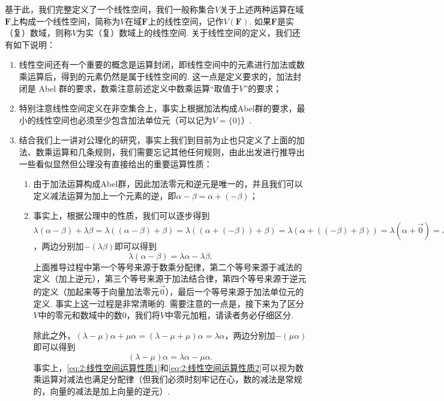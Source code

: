 基于此，我们完整定义了一个线性空间，我们一般称集合$V$关于上述两种运算在域$\mathbf{F}$上构成一个线性空间，简称为$V$在域$\mathbf{F}$上的线性空间，记作$V(\mathbf{F})$. 如果$\mathbf{F}$是实（复）数域，则称$V$为实（复）数域上的线性空间. 关于线性空间的定义，我们还有如下说明：
\begin{enumerate}
    \item 线性空间还有一个重要的概念是运算封闭，即线性空间中的元素进行加法或数乘运算后，得到的元素仍然是属于线性空间的. 这一点是定义要求的，加法封闭是 Abel 群的要求，数乘注意前述定义中数乘运算``取值于$V$''的要求；

    \item 特别注意线性空间定义在非空集合上，事实上根据加法构成Abel群的要求，最小的线性空间也必须至少包含加法单位元（可以记为$V=\{0\}$）.

    \item 结合我们上一讲对公理化的研究，事实上我们到目前为止也只定义了上面的加法、数乘运算和几条规则，我们需要忘记其他任何规则，由此出发进行推导出一些看似显然但公理没有直接给出的重要运算性质：
    \begin{enumerate}
        \item 由于加法运算构成Abel群，因此加法零元和逆元是唯一的，并且我们可以定义减法运算为加上一个元素的逆，即$\alpha-\beta=\alpha+(-\beta)$；

        \item 事实上，根据公理中的性质，我们可以逐步得到$\lambda(\alpha-\beta)+\lambda\beta=\lambda((\alpha-\beta)+\beta)=\lambda((\alpha+(-\beta))+\beta)=\lambda(\alpha+((-\beta)+\beta))=\lambda(\alpha+\vec{0})=\lambda\alpha$，两边分别加$-(\lambda\beta)$即可以得到
        \begin{equation}\label{eq:2:线性空间运算性质1}
            \lambda(\alpha-\beta)=\lambda\alpha-\lambda\beta.
        \end{equation}
        上面推导过程中第一个等号来源于数乘分配律，第二个等号来源于减法的定义（加上逆元），第三个等号来源于加法结合律，第四个等号来源于逆元的定义（加起来等于向量加法零元$\vec{0}$），最后一个等号来源于加法单位元的定义. 事实上这一过程是非常清晰的. 需要注意的一点是，接下来为了区分$V$中的零元和数域中的数0，我们将$V$中零元加粗，请读者务必仔细区分.

        除此之外，$(\lambda-\mu)\alpha+\mu\alpha=(\lambda-\mu+\mu)\alpha=\lambda\alpha$，两边分别加$-(\mu\alpha)$即可以得到
        \begin{equation}\label{eq:2:线性空间运算性质2}
            (\lambda-\mu)\alpha=\lambda\alpha-\mu\alpha.
        \end{equation}
        事实上，\autoref{eq:2:线性空间运算性质1}和\autoref{eq:2:线性空间运算性质2}可以视为数乘运算对减法也满足分配律（但我们必须时刻牢记在心，数的减法是常规的，向量的减法是加上向量的逆元）.


\end{enumerate}
\end{enumerate}
